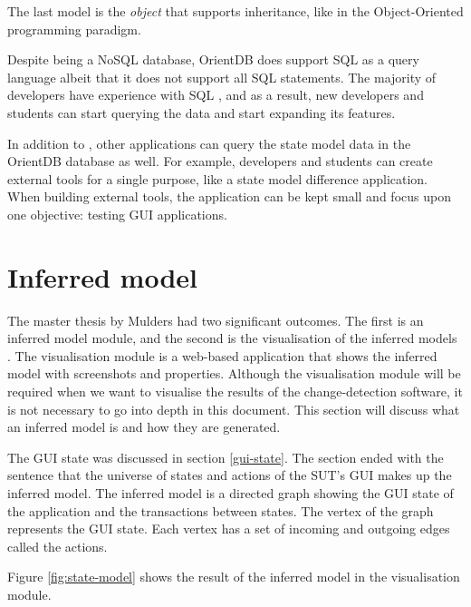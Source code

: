 The last model is the \hypertarget{db:object}{\emph{object}} that supports inheritance, like in the Object-Oriented programming paradigm.\par

Despite being a NoSQL database, OrientDB does support SQL as a query language \cite{sql-lang} albeit that it does not support all SQL statements. The majority of developers have experience with SQL \cite{sql-stats}, and as a result, new developers and students can start querying the \testar data and start expanding its features.\par

In addition to \testar, other applications can query the state model data in the OrientDB database as well. For example, developers and students can create external tools for a single purpose, like a state model difference application. When building external tools, the \testar application can be kept small and focus upon one objective: testing GUI applications. 

\section{Inferred model} \label{inferred-model}
The master thesis by Mulders had two significant outcomes. The first is an inferred model module, and the second is the visualisation of the inferred models \cite{thesisMulders}. The visualisation module is a web-based application that shows the inferred model with screenshots and properties. Although the visualisation module will be required when we want to visualise the results of the change-detection software, it is not necessary to go into depth in this document. This section will discuss what an inferred model is and how they are generated. 

The GUI state was discussed in section \ref{gui-state}. The section ended with the sentence that the universe of states and actions of the SUT's GUI makes up the inferred model. The inferred model is a directed graph showing the GUI state of the application and the transactions between states. The vertex of the graph represents the GUI state. Each vertex has a set of incoming and outgoing edges called the actions. 

Figure \ref{fig:state-model} shows the result of the inferred model in the visualisation module.

